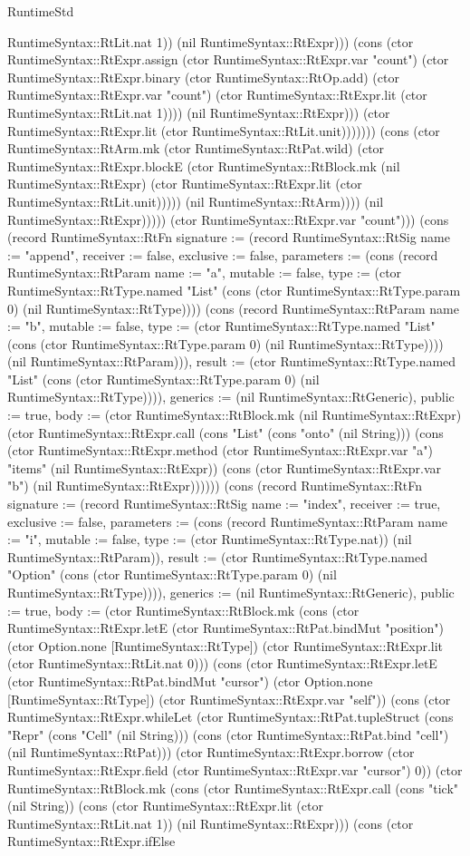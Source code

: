 \begin{lexlean}{RuntimeStd}
\begin{semanticmodule}
{RuntimeSyntax::RtLit.nat 1)) (nil RuntimeSyntax::RtExpr))) (cons (ctor RuntimeSyntax::RtExpr.assign (ctor RuntimeSyntax::RtExpr.var "count") (ctor RuntimeSyntax::RtExpr.binary (ctor RuntimeSyntax::RtOp.add) (ctor RuntimeSyntax::RtExpr.var "count") (ctor RuntimeSyntax::RtExpr.lit (ctor RuntimeSyntax::RtLit.nat 1)))) (nil RuntimeSyntax::RtExpr))) (ctor RuntimeSyntax::RtExpr.lit (ctor RuntimeSyntax::RtLit.unit))))))) (cons (ctor RuntimeSyntax::RtArm.mk (ctor RuntimeSyntax::RtPat.wild) (ctor RuntimeSyntax::RtExpr.blockE (ctor RuntimeSyntax::RtBlock.mk (nil RuntimeSyntax::RtExpr) (ctor RuntimeSyntax::RtExpr.lit (ctor RuntimeSyntax::RtLit.unit))))) (nil RuntimeSyntax::RtArm)))) (nil RuntimeSyntax::RtExpr))))) (ctor RuntimeSyntax::RtExpr.var "count"))}) (cons (record RuntimeSyntax::RtFn {signature := (record RuntimeSyntax::RtSig {name := "append", receiver := false, exclusive := false, parameters := (cons (record RuntimeSyntax::RtParam {name := "a", mutable := false, type := (ctor RuntimeSyntax::RtType.named "List" (cons (ctor RuntimeSyntax::RtType.param 0) (nil RuntimeSyntax::RtType)))}) (cons (record RuntimeSyntax::RtParam {name := "b", mutable := false, type := (ctor RuntimeSyntax::RtType.named "List" (cons (ctor RuntimeSyntax::RtType.param 0) (nil RuntimeSyntax::RtType)))}) (nil RuntimeSyntax::RtParam))), result := (ctor RuntimeSyntax::RtType.named "List" (cons (ctor RuntimeSyntax::RtType.param 0) (nil RuntimeSyntax::RtType)))}), generics := (nil RuntimeSyntax::RtGeneric), public := true, body := (ctor RuntimeSyntax::RtBlock.mk (nil RuntimeSyntax::RtExpr) (ctor RuntimeSyntax::RtExpr.call (cons "List" (cons "onto" (nil String))) (cons (ctor RuntimeSyntax::RtExpr.method (ctor RuntimeSyntax::RtExpr.var "a") "items" (nil RuntimeSyntax::RtExpr)) (cons (ctor RuntimeSyntax::RtExpr.var "b") (nil RuntimeSyntax::RtExpr)))))}) (cons (record RuntimeSyntax::RtFn {signature := (record RuntimeSyntax::RtSig {name := "index", receiver := true, exclusive := false, parameters := (cons (record RuntimeSyntax::RtParam {name := "i", mutable := false, type := (ctor RuntimeSyntax::RtType.nat)}) (nil RuntimeSyntax::RtParam)), result := (ctor RuntimeSyntax::RtType.named "Option" (cons (ctor RuntimeSyntax::RtType.param 0) (nil RuntimeSyntax::RtType)))}), generics := (nil RuntimeSyntax::RtGeneric), public := true, body := (ctor RuntimeSyntax::RtBlock.mk (cons (ctor RuntimeSyntax::RtExpr.letE (ctor RuntimeSyntax::RtPat.bindMut "position") (ctor Option.none [RuntimeSyntax::RtType]) (ctor RuntimeSyntax::RtExpr.lit (ctor RuntimeSyntax::RtLit.nat 0))) (cons (ctor RuntimeSyntax::RtExpr.letE (ctor RuntimeSyntax::RtPat.bindMut "cursor") (ctor Option.none [RuntimeSyntax::RtType]) (ctor RuntimeSyntax::RtExpr.var "self")) (cons (ctor RuntimeSyntax::RtExpr.whileLet (ctor RuntimeSyntax::RtPat.tupleStruct (cons "Repr" (cons "Cell" (nil String))) (cons (ctor RuntimeSyntax::RtPat.bind "cell") (nil RuntimeSyntax::RtPat))) (ctor RuntimeSyntax::RtExpr.borrow (ctor RuntimeSyntax::RtExpr.field (ctor RuntimeSyntax::RtExpr.var "cursor") 0)) (ctor RuntimeSyntax::RtBlock.mk (cons (ctor RuntimeSyntax::RtExpr.call (cons "tick" (nil String)) (cons (ctor RuntimeSyntax::RtExpr.lit (ctor RuntimeSyntax::RtLit.nat 1)) (nil RuntimeSyntax::RtExpr))) (cons (ctor RuntimeSyntax::RtExpr.ifElse }
\end{semanticmodule}
\end{lexlean}
